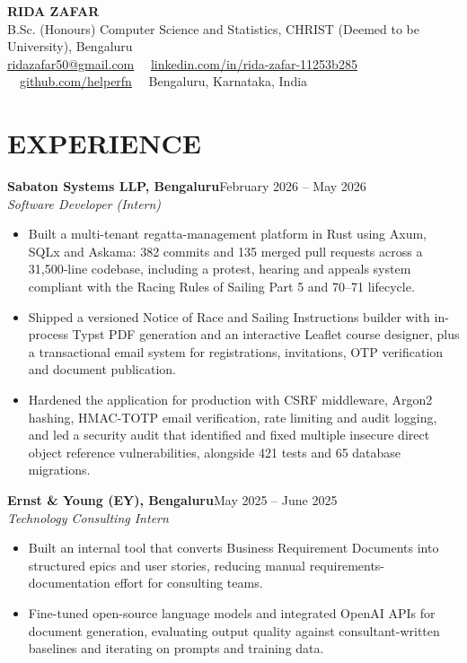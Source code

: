 \documentclass[10pt,letterpaper]{article}
\newcommand{\entry}[3]{%
  \textbf{#1}\hfill #2\\
  \textit{#3}\\[1pt]%
}
\begin{document}
\begin{center}
  {\LARGE\bfseries RIDA ZAFAR}\\[2pt]
  B.Sc. (Honours) Computer Science and Statistics,
  CHRIST (Deemed to be University), Bengaluru\\[2pt]
  \href{mailto:ridazafar50@gmail.com}{ridazafar50@gmail.com}
  \ \textbar\
  \href{https://linkedin.com/in/rida-zafar-11253b285}%
       {linkedin.com/in/rida-zafar-11253b285}
  \ \textbar\
  \href{https://github.com/helperfn}{github.com/helperfn}
  \ \textbar\
  Bengaluru, Karnataka, India
\end{center}

\section{EXPERIENCE}

\entry{Sabaton Systems LLP, Bengaluru}{February 2026 -- May 2026}
      {Software Developer (Intern)}
\begin{itemize}
  \item Built a multi-tenant regatta-management platform in Rust using Axum,
        SQLx and Askama: 382 commits and 135 merged pull requests across a
        31,500-line codebase, including a protest, hearing and appeals system
        compliant with the Racing Rules of Sailing Part 5 and 70--71 lifecycle.
  \item Shipped a versioned Notice of Race and Sailing Instructions builder with
        in-process Typst PDF generation and an interactive Leaflet course
        designer, plus a transactional email system for registrations,
        invitations, OTP verification and document publication.
  \item Hardened the application for production with CSRF middleware, Argon2
        hashing, HMAC-TOTP email verification, rate limiting and audit logging,
        and led a security audit that identified and fixed multiple insecure
        direct object reference vulnerabilities, alongside 421 tests and 65
        database migrations.
\end{itemize}

\vspace{4pt}
\entry{Ernst \& Young (EY), Bengaluru}{May 2025 -- June 2025}
      {Technology Consulting Intern}
\begin{itemize}
  \item Built an internal tool that converts Business Requirement Documents into
        structured epics and user stories, reducing manual
        requirements-documentation effort for consulting teams.
  \item Fine-tuned open-source language models and integrated OpenAI APIs for
        document generation, evaluating output quality against
        consultant-written baselines and iterating on prompts and training data.
\end{itemize}
\end{document}
